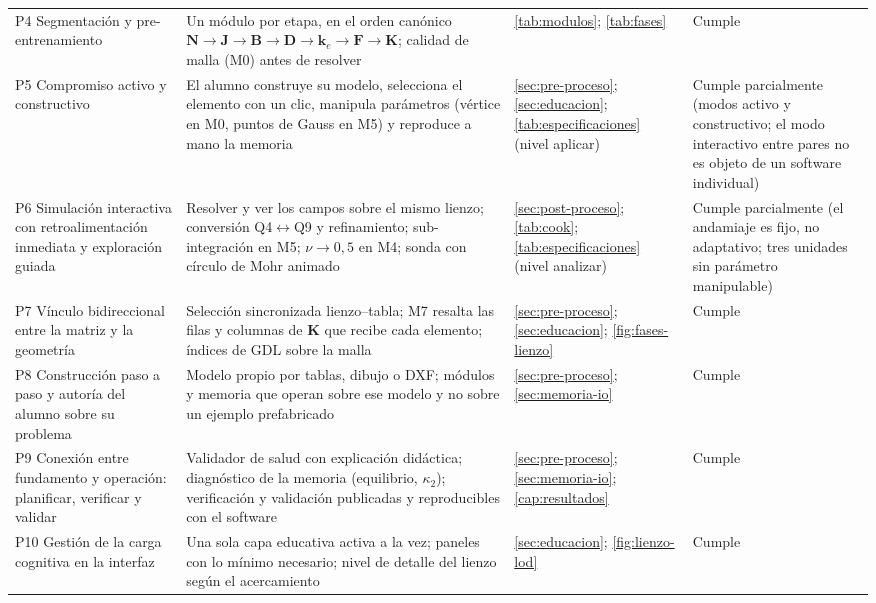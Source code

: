 {\begin{longtable}{@{}>{\raggedright\arraybackslash}p{3.3cm}>{\raggedright\arraybackslash}p{4.7cm}>{\raggedright\arraybackslash}p{4.7cm}>{\raggedright\arraybackslash}p{2.0cm}@{}}
P4 Segmentación y pre-entrenamiento \autocite{mayer2009multimedia} & Un módulo por etapa, en el orden canónico $\bm{N}\rightarrow\bm{J}\rightarrow\bm{B}\rightarrow\bm{D}\rightarrow\bm{k}_e\rightarrow\bm{F}\rightarrow\bm{K}$; calidad de malla (M0) antes de resolver & \autoref{tab:modulos}; \autoref{tab:fases} & Cumple \\
P5 Compromiso activo y constructivo \autocite{chi2014icap} & El alumno construye su modelo, selecciona el elemento con un clic, manipula parámetros (vértice en M0, puntos de Gauss en M5) y reproduce a mano la memoria & \autoref{sec:pre-proceso}; \autoref{sec:educacion}; \autoref{tab:especificaciones} (nivel aplicar) & Cumple parcialmente (modos activo y constructivo; el modo interactivo entre pares no es objeto de un software individual) \\
P6 Simulación interactiva con retroalimentación inmediata y exploración guiada \autocite{wieman2008phet,rutten2012learning,dangelo2014simulations} & Resolver y ver los campos sobre el mismo lienzo; conversión Q4$\leftrightarrow$Q9 y refinamiento; sub-integración en M5; $\nu \to 0{,}5$ en M4; sonda con círculo de Mohr animado & \autoref{sec:post-proceso}; \autoref{tab:cook}; \autoref{tab:especificaciones} (nivel analizar) & Cumple parcialmente (el andamiaje es fijo, no adaptativo; tres unidades sin parámetro manipulable) \\
P7 Vínculo bidireccional entre la matriz y la geometría \autocite[pp.~158, 163, 166]{lee2015interactive} & Selección sincronizada lienzo--tabla; M7 resalta las filas y columnas de $\bm{K}$ que recibe cada elemento; índices de GDL sobre la malla & \autoref{sec:pre-proceso}; \autoref{sec:educacion}; \autoref{fig:fases-lienzo} & Cumple \\
P8 Construcción paso a paso y autoría del alumno sobre su problema \autocite[pp.~4-5, 13, 17]{bishay2020teaching} & Modelo propio por tablas, dibujo o DXF; módulos y memoria que operan sobre ese modelo y no sobre un ejemplo prefabricado & \autoref{sec:pre-proceso}; \autoref{sec:memoria-io} & Cumple \\
P9 Conexión entre fundamento y operación: planificar, verificar y validar \autocite[pp.~1159, 1168]{perezsantiago2023fem} & Validador de salud con explicación didáctica; diagnóstico de la memoria (equilibrio, $\kappa_2$); verificación y validación publicadas y reproducibles con el software & \autoref{sec:pre-proceso}; \autoref{sec:memoria-io}; \autoref{cap:resultados} & Cumple \\
P10 Gestión de la carga cognitiva en la interfaz \autocite{mayer2009multimedia,sweller2019cognitive} & Una sola capa educativa activa a la vez; paneles con lo mínimo necesario; nivel de detalle del lienzo según el acercamiento & \autoref{sec:educacion}; \autoref{fig:lienzo-lod} & Cumple \\
\end{longtable}}

